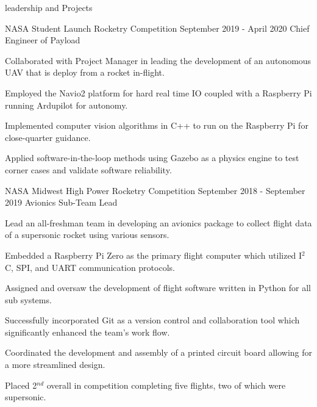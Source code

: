 \documentclass{resume} %
\begin{document}
    \begin{rSection} {leadership and Projects}

        \begin{rSubsection} {NASA Student Launch Rocketry Competition} {September 2019 - April 2020} {Chief Engineer of Payload}

            \item Collaborated with Project Manager in leading the development of an autonomous UAV that is deploy from a rocket in-flight.
            \item Employed the Navio2 platform for hard real time IO coupled with a Raspberry Pi running Ardupilot for autonomy.
            \item Implemented computer vision algorithms in C++ to run on the Raspberry Pi for close-quarter guidance.
            \item Applied software-in-the-loop methods using Gazebo as a physics engine to test corner cases and validate software reliability.


        \end{rSubsection}



        \begin{rSubsection} {NASA Midwest High Power Rocketry Competition} {September 2018 - September 2019} {Avionics Sub-Team Lead}

            \item Lead an all-freshman team in developing an avionics package to collect flight data of a supersonic rocket using various sensors.
            \item Embedded a Raspberry Pi Zero as the primary flight computer which utilized I$^2$C, SPI, and UART communication protocols.
            \item Assigned and oversaw the development of flight software written in Python for all sub systems.
            \item Successfully incorporated Git as a version control and collaboration tool which significantly enhanced the team's work flow.
            \item Coordinated the development and assembly of a printed circuit board allowing for a more streamlined design.
            \item Placed 2$^{nd}$ overall in competition completing five flights, two of which were supersonic.


\end{rSubsection}
\end{rSection}
\end{document}
